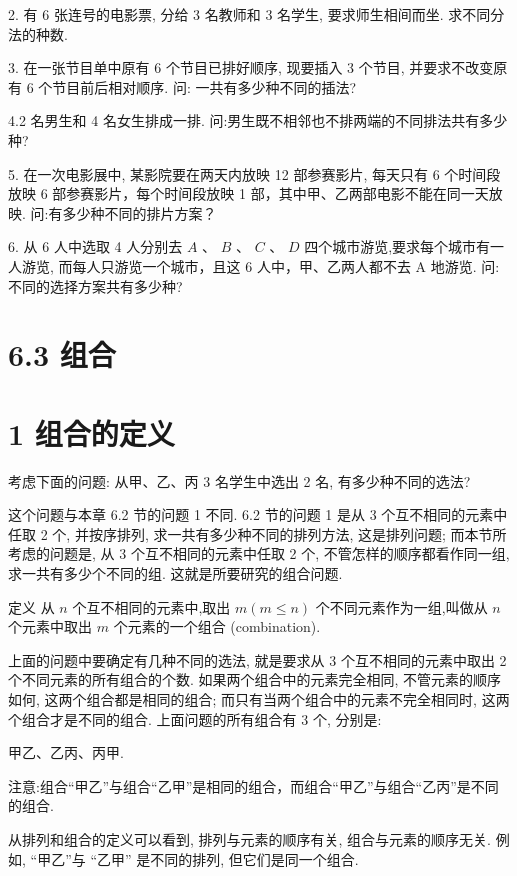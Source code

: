\documentclass[10pt]{article}
\begin{document}
2. 有 6 张连号的电影票, 分给 3 名教师和 3 名学生, 要求师生相间而坐. 求不同分法的种数.

3. 在一张节目单中原有 6 个节目已排好顺序, 现要插入 3 个节目, 并要求不改变原有 6 个节目前后相对顺序. 问: 一共有多少种不同的插法?

4.2 名男生和 4 名女生排成一排. 问:男生既不相邻也不排两端的不同排法共有多少种?

5. 在一次电影展中, 某影院要在两天内放映 12 部参赛影片, 每天只有 6 个时间段放映 6 部参赛影片，每个时间段放映 1 部，其中甲、乙两部电影不能在同一天放映. 问:有多少种不同的排片方案？

6. 从 6 人中选取 4 人分别去 \(A\text{ 、 }B\text{ 、 }C\text{ 、 }D\) 四个城市游览,要求每个城市有一人游览, 而每人只游览一个城市，且这 6 人中，甲、乙两人都不去 A 地游览. 问:不同的选择方案共有多少种?

\section*{6.3 组合}

\section*{1 组合的定义}

考虑下面的问题: 从甲、乙、丙 3 名学生中选出 2 名, 有多少种不同的选法?

这个问题与本章 6.2 节的问题 1 不同. 6.2 节的问题 1 是从 3 个互不相同的元素中任取 2 个, 并按序排列, 求一共有多少种不同的排列方法, 这是排列问题; 而本节所考虑的问题是, 从 3 个互不相同的元素中任取 2 个, 不管怎样的顺序都看作同一组, 求一共有多少个不同的组. 这就是所要研究的组合问题.

定义 从 \(n\) 个互不相同的元素中,取出 \(m\left( {m \leq  n}\right)\) 个不同元素作为一组,叫做从 \(n\) 个元素中取出 \(m\) 个元素的一个组合 (combination).

上面的问题中要确定有几种不同的选法, 就是要求从 3 个互不相同的元素中取出 2 个不同元素的所有组合的个数. 如果两个组合中的元素完全相同, 不管元素的顺序如何, 这两个组合都是相同的组合; 而只有当两个组合中的元素不完全相同时, 这两个组合才是不同的组合. 上面问题的所有组合有 3 个, 分别是:

甲乙、乙丙、丙甲.

注意:组合“甲乙”与组合“乙甲”是相同的组合，而组合“甲乙”与组合“乙丙”是不同的组合.

从排列和组合的定义可以看到, 排列与元素的顺序有关, 组合与元素的顺序无关. 例如, “甲乙”与 “乙甲” 是不同的排列, 但它们是同一个组合.
\end{document}
